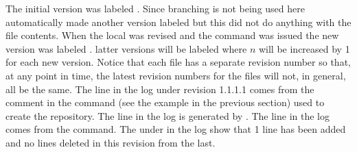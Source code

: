The initial version was labeled . Since branching is not
being used here \svn automatically made another version labeled
 but this did not do anything with the file contents. When the
local  was revised and the  command was
issued the new version was labeled . latter versions will be
labeled  where $n$ will be increased by 1 for each new
version. Notice that each file has a separate revision number so that,
at any point in time, the latest revision numbers for the files will
not, in general, all be the same. The  line in the log
under revision 1.1.1.1 comes from the  comment in the  command (see the example in the previous section) used to
create the  repository. The  line in the
log is generated by \svn. The  line in the log
comes from the  command.  The  under
 in the log show that 1 line has been added and no
lines deleted in this revision from the last.


